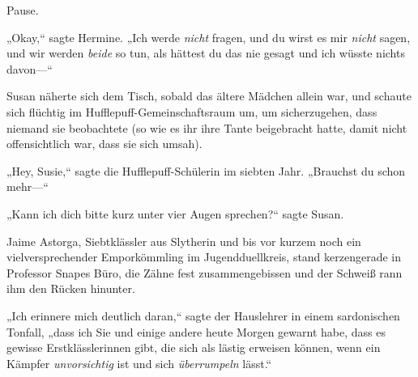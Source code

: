 Pause.

„Okay,“ sagte Hermine. „Ich werde \emph{nicht} fragen, und du wirst es mir \emph{nicht} sagen, und wir werden \emph{beide} so tun, als hättest du das nie gesagt und ich wüsste nichts davon—“

\later

Susan näherte sich dem Tisch, sobald das ältere Mädchen allein war, und schaute sich flüchtig im Hufflepuff-Gemeinschaftsraum um, um sicherzugehen, dass niemand sie beobachtete (so wie es ihr ihre Tante beigebracht hatte, damit nicht offensichtlich war, dass sie sich umsah).

„Hey, Susie,“ sagte die Hufflepuff-Schülerin im siebten Jahr. „Brauchst du schon mehr—“

„Kann ich dich bitte kurz unter vier Augen sprechen?“ sagte Susan.

\later

Jaime Astorga, Siebtklässler aus Slytherin und bis vor kurzem noch ein vielversprechender Emporkömmling im Jugendduellkreis, stand kerzengerade in Professor Snapes Büro, die Zähne fest zusammengebissen und der Schweiß rann ihm den Rücken hinunter.

„Ich erinnere mich deutlich daran,“ sagte der Hauslehrer in einem sardonischen Tonfall, „dass ich Sie und einige andere heute Morgen gewarnt habe, dass es gewisse Erstklässlerinnen gibt, die sich als lästig erweisen können, wenn ein Kämpfer \emph{unvorsichtig} ist und sich \emph{überrumpeln} lässt.“

